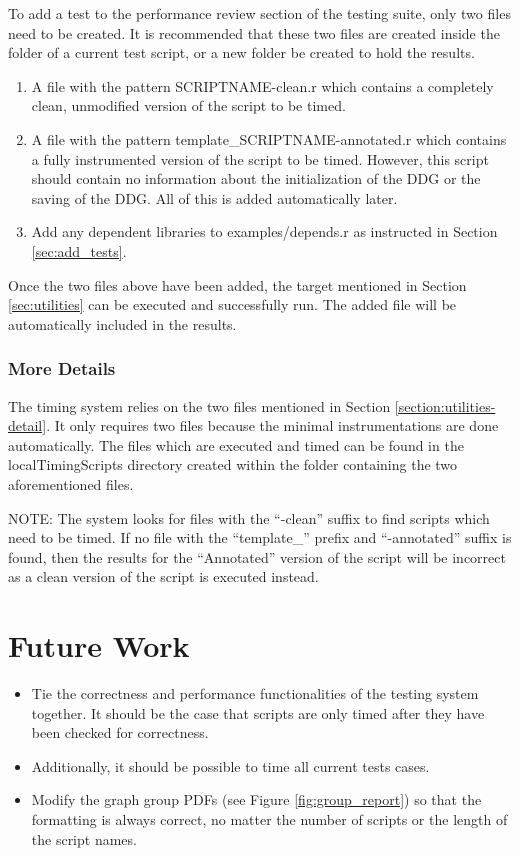 \documentclass[12pt]{article}
\begin{document}
\bigskip
To add a test to the performance review section of the testing suite, only two files need to be created. It is recommended that these two files are created inside the folder of a current test script, or a new folder be created to hold the results.
\begin{enumerate}
\item A file with the pattern SCRIPTNAME-clean.r which contains a completely clean, unmodified version of the script to be timed.
\item A file with the pattern template\_SCRIPTNAME-annotated.r which contains a fully instrumented version of the script to be timed. However, this script should contain no information about the initialization of the DDG or the saving of the DDG. All of this is added automatically later.
\item Add any dependent libraries to examples/depends.r as instructed in Section \ref{sec:add_tests}.
\end{enumerate}

Once the two files above have been added, the target mentioned in Section \ref{sec:utilities} can be executed and successfully run. The added file will be automatically included in the results.

\subsubsection{More Details}
The timing system relies on the two files mentioned in Section \ref{section:utilities-detail}. It only requires two files because the minimal instrumentations are done automatically. The files which are executed and timed can be found in the localTimingScripts directory created within the folder containing the two aforementioned files.

NOTE: The system looks for files with the ``-clean'' suffix to find scripts which need to be timed. If no file with the ``template\_'' prefix and ``-annotated''  suffix is found, then the results for the ``Annotated'' version of the script will be incorrect as a clean version of the script is executed instead. 

\newpage

\section{Future Work}
\begin{itemize}
\item Tie the correctness and performance functionalities of the testing system together. It should be the case that scripts are only timed after they have been checked for correctness.
\item Additionally, it should be possible to time all current tests cases.
\item Modify the graph group PDFs (see Figure \ref{fig:group_report}) so that the formatting is always correct, no matter the number of scripts or the length of the script names.
\end{itemize}
\end{document}
